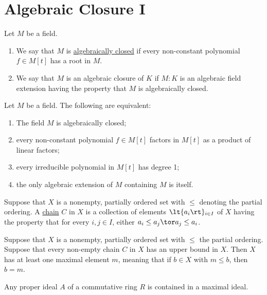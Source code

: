 \documentclass[a4paper]{article}
\begin{document}
\section{Algebraic Closure I}
\begin{tdefinition}
  Let \( M \) be a field. \begin{enumerate}[label=(\roman*)]
    \item We say that \( M \) is \ul{algebraically closed} if every non-constant polynomial \( f\in M[t] \) has a root in \( M \).
    \item We say that \( M \) is an algebraic closure of \( K \) if \( M:K \) is an algebraic field extension having the property that \( M \) is algebraically closed.
  \end{enumerate}
\end{tdefinition}

\begin{tlemma}
  Let \( M \) be a field.
  The following are equivalent: \begin{enumerate}[label=(\roman*)]
    \item The field \( M \) is algebraically closed;
    \item every non-constant polynomial \( f\in M[t] \) factors in \( M[t] \) as a product of linear factors;
    \item every irreducible polynomial in \( M[t] \) has degree 1;
    \item the only algebraic extension of \( M \) containing \( M \) is itself.
  \end{enumerate}
\end{tlemma}

\begin{tdefinition}[Chain]
  Suppose that \( X \) is a nonempty, partially ordered set with \( \leq \) denoting the partial ordering.
  A \ul{chain} \( C \) in \( X \) is a collection of elements \( \lt\{ a_i \rt\}_{i\in I} \) of \( X \) having the property that for every \( i,j\in I \), either \( a_i\leq a_j \tor a_j\leq a_i \).
\end{tdefinition}

\quad Suppose that \( X \) is a nonempty, partially ordered set with \( \leq \) the partial ordering.
Suppose that every non-empty chain \( C \) in \( X \) has an upper bound in \( X \).
Then \( X \) has at least one maximal element \( m \), meaning that if \( b\in X \) with \( m\leq b \), then \( b=m \).

\begin{tcorollary}
  Any proper ideal \( A \) of a commutative ring \( R \) is contained in a maximal ideal.
\end{tcorollary}
\end{document}
